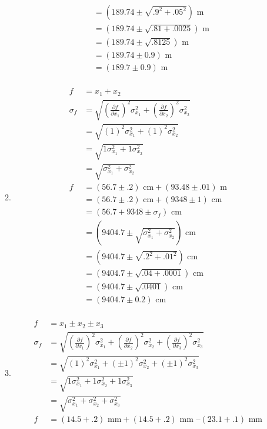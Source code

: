 \documentclass{article}
\begin{document}
\begin{enumerate}
\begin{enumerate}
\begin{align*}
&= (189.74 \pm \sqrt{.9^2 + .05^2})\text{ m}\\
&= (189.74 \pm \sqrt{.81 + .0025})\text{ m}\\
&= (189.74 \pm \sqrt{.8125})\text{ m}\\
&= (189.74 \pm 0.9)\text{ m}\\
&= (189.7 \pm 0.9)\text{ m}\\
\end{align*}
\item
\begin{align*}
f &= x_{1} + x_{2}\\
\sigma_{f} &= \sqrt{(\frac{\partial f}{\partial x_{1}})^2\sigma_{x_{1}}^2 + (\frac{\partial f}{\partial x_{2}})^2\sigma_{x_{2}}^2}\\
&= \sqrt{(1)^2\sigma_{x_{1}}^2 + (1)^2\sigma_{x_{2}}^2}\\
&= \sqrt{1\sigma_{x_{1}}^2 + 1\sigma_{x_{2}}^2}\\
&= \sqrt{\sigma_{x_{1}}^2 + \sigma_{x_{2}}^2}\\
f &= (56.7 \pm .2)\text{ cm} + (93.48 \pm .01)\text{ m}\\
&= (56.7 \pm .2)\text{ cm} + (9348 \pm 1)\text{ cm}\\
&= (56.7 + 9348 \pm \sigma_{f})\text{ cm}\\
&= (9404.7 \pm \sqrt{\sigma_{x_{1}}^2 + \sigma_{x_{2}}^2})\text{ cm}\\
&= (9404.7 \pm \sqrt{.2^2 + .01^2})\text{ cm}\\
&= (9404.7 \pm \sqrt{.04 + .0001})\text{ cm}\\
&= (9404.7 \pm \sqrt{.0401})\text{ cm}\\
&= (9404.7 \pm 0.2)\text{ cm}\\
\end{align*}
\item
\begin{align*}
f &= x_{1} \pm x_{2} \pm x_{3}\\
\sigma_{f} &= \sqrt{(\frac{\partial f}{\partial x_{1}})^2\sigma_{x_{1}}^2 + (\frac{\partial f}{\partial x_{2}})^2\sigma_{x_{2}}^2 + (\frac{\partial f}{\partial x_{3}})^2\sigma_{x_{3}}^2}\\
&= \sqrt{(1)^2\sigma_{x_{1}}^2 + (\pm1)^2\sigma_{x_{2}}^2 + (\pm1)^2\sigma_{x_{3}}^2}\\
&= \sqrt{1\sigma_{x_{1}}^2 + 1\sigma_{x_{2}}^2 + 1\sigma_{x_{3}}^2}\\
&= \sqrt{\sigma_{x_{1}}^2 + \sigma_{x_{2}}^2 + \sigma_{x_{3}}^2}\\
f &= (14.5 + .2)\text{ mm} + (14.5 + .2)\text{ mm } – (23.1 + .1)\text{ mm}\\

\end{align*}
\end{enumerate}
\end{enumerate}
\end{document}
